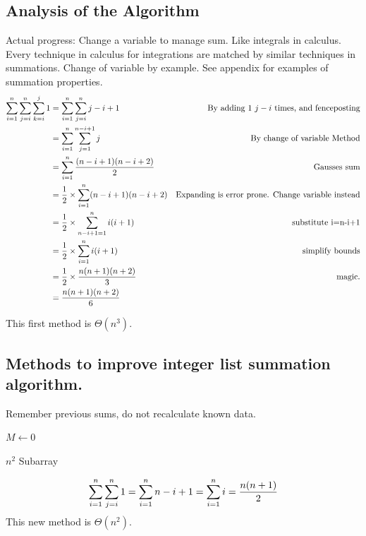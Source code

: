 \documentclass[english, 10pt]{article}
\begin{document}
\subsection{Analysis of the Algorithm}
Actual progress: Change a variable to manage sum. Like integrals in calculus. Every technique in calculus for integrations are matched by similar techniques in summations.
Change of variable by example. See appendix for examples of summation properties.
\begin{align*}
    \sum_{i=1}^{n} \sum_{j=i}^{n} \sum_{k=i}^{j} 1 &= \sum_{i=1}^{n} \sum_{j=i}^{n} j-i+1 & \text{By adding 1 $j-i$ times, and fenceposting} \\
    &= \sum_{i=1}^{n} \sum_{j=1}^{n-i+1} j & \text{By change of variable Method} \\
    &= \sum_{i=1}^{n} \frac{(n-i+1)(n-i+2)}{2} & \text{Gausses sum} \\
    &= \frac{1}{2}\times \sum_{i=1}^{n} (n-i+1)(n-i+2) & \text{Expanding is error prone. Change variable instead} \\
    &= \frac{1}{2}\times \sum_{n-i+1=1}^{n} i(i+1) & \text{substitute i=n-i+1} \\
    &= \frac{1}{2}\times \sum_{i=1}^{n} i(i+1) & \text{simplify bounds} \\
    &= \frac{1}{2}\times \frac{n(n+1)(n+2)}{3} & \text{magic.} \\
    &= \frac{n(n+1)(n+2)}{6} \\
\end{align*}

This first method is $\Theta{\left(n^3\right)}$.

\subsection{Methods to improve integer list summation algorithm.}
Remember previous sums, do not recalculate known data.

\begin{algorithm}[H]
$M\gets0$\;
\caption{$n^2$ Subarray }
\end{algorithm}
$$
    \sum_{i=1}^{n} \sum_{j=i}^{n} 1 = \sum_{i=1}^n n-i+1 \\
    = \sum_{i=1}^{n} i = \frac{n(n+1)}{2}
$$
This new method is $\Theta{\left(n^2\right)} $.
\end{document}
